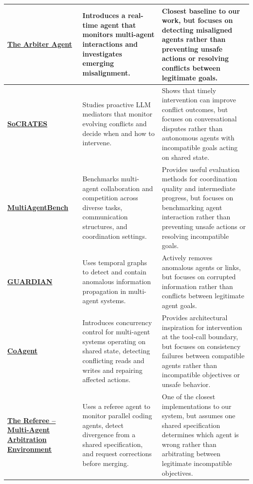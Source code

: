\documentclass[11pt]{article}
\begin{document}
\begin{xltabular}{\textwidth}{
    >{\raggedright\arraybackslash}p{0.20\textwidth}
    >{\raggedright\arraybackslash}p{0.28\textwidth}
    >{\raggedright\arraybackslash}X
}
\midrule

\href{https://arxiv.org/abs/2606.10747}
{\textbf{The Arbiter Agent}}
&
Introduces a real-time agent that monitors multi-agent interactions and investigates emerging misalignment.
&
Closest baseline to our work, but focuses on detecting misaligned agents rather than preventing unsafe actions or resolving conflicts between legitimate goals. \\

\midrule

\href{https://arxiv.org/abs/2606.05563}
{\textbf{SoCRATES}}
&
Studies proactive LLM mediators that monitor evolving conflicts and decide when and how to intervene.
&
Shows that timely intervention can improve conflict outcomes, but focuses on conversational disputes rather than autonomous agents with incompatible goals acting on shared state. \\

\midrule

\href{https://aclanthology.org/2025.acl-long.421/}
{\textbf{MultiAgentBench}}
&
Benchmarks multi-agent collaboration and competition across diverse tasks, communication structures, and coordination settings.
&
Provides useful evaluation methods for coordination quality and intermediate progress, but focuses on benchmarking agent interaction rather than preventing unsafe actions or resolving incompatible goals. \\

\midrule

\href{https://arxiv.org/abs/2505.19234}
{\textbf{GUARDIAN}}
&
Uses temporal graphs to detect and contain anomalous information propagation in multi-agent systems.
&
Actively removes anomalous agents or links, but focuses on corrupted information rather than conflicts between legitimate agent goals. \\

\midrule

\href{https://arxiv.org/abs/2606.15376}
{\textbf{CoAgent}}
&
Introduces concurrency control for multi-agent systems operating on shared state, detecting conflicting reads and writes and repairing affected actions.
&
Provides architectural inspiration for intervention at the tool-call boundary, but focuses on consistency failures between compatible agents rather than incompatible objectives or unsafe behavior. \\

\midrule

\href{https://github.com/jeeevan11/conflict-arbitration-env}
{\textbf{The Referee -- Multi-Agent Arbitration Environment}}
&
Uses a referee agent to monitor parallel coding agents, detect divergence from a shared specification, and request corrections before merging.
&
One of the closest implementations to our system, but assumes one shared specification determines which agent is wrong rather than arbitrating between legitimate incompatible objectives. \\


\end{xltabular}
\end{document}
